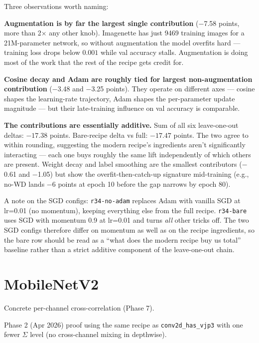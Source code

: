 Three observations worth naming:

\textbf{Augmentation is by far the largest single contribution}
($-$7.58 points, more than 2$\times$ any other knob). Imagenette
has just 9469 training images for a 21M-parameter network, so
without augmentation the model overfits hard --- training loss
drops below $0.001$ while val accuracy stalls. Augmentation is
doing most of the work that the rest of the recipe gets credit
for.

\textbf{Cosine decay and Adam are roughly tied for largest
non-augmentation contribution} ($-$3.48 and $-$3.25 points). They
operate on different axes --- cosine shapes the learning-rate
trajectory, Adam shapes the per-parameter update magnitude --- but
their late-training influence on val accuracy is comparable.

\textbf{The contributions are essentially additive.} Sum of all
six leave-one-out deltas: $-17.38$ points. Bare-recipe delta vs
full: $-17.47$ points. The two agree to within rounding, suggesting
the modern recipe's ingredients aren't significantly interacting ---
each one buys roughly the same lift independently of which others
are present. Weight decay and label smoothing are the smallest
contributors ($-$0.61 and $-$1.05) but show the
overfit-then-catch-up signature mid-training (e.g., no-WD lands
$-$6 points at epoch 10 before the gap narrows by epoch 80).

A note on the SGD configs: \texttt{r34-no-adam} replaces Adam with
vanilla SGD at lr=0.01 (no momentum), keeping everything else from
the full recipe. \texttt{r34-bare} uses SGD with momentum 0.9 at
lr=0.01 and turns \emph{all} other tricks off. The two SGD configs
therefore differ on momentum as well as on the recipe ingredients,
so the bare row should be read as a ``what does the modern recipe
buy us total'' baseline rather than a strict additive component of
the leave-one-out chain.

\chapter{MobileNetV2}
\label{chap:depthwise}

\begin{definition}
  \label{ax:depthwiseConv2d}
  \leanok
  Concrete per-channel cross-correlation (Phase 7).
\end{definition}

\begin{theorem}
  \label{ax:depthwise_has_vjp3}
  \leanok
  Phase 2 (Apr 2026) proof using the same recipe as
  \texttt{conv2d\_has\_vjp3} with one fewer \(\Sigma\) level (no
  cross-channel mixing in depthwise).
\end{theorem}

